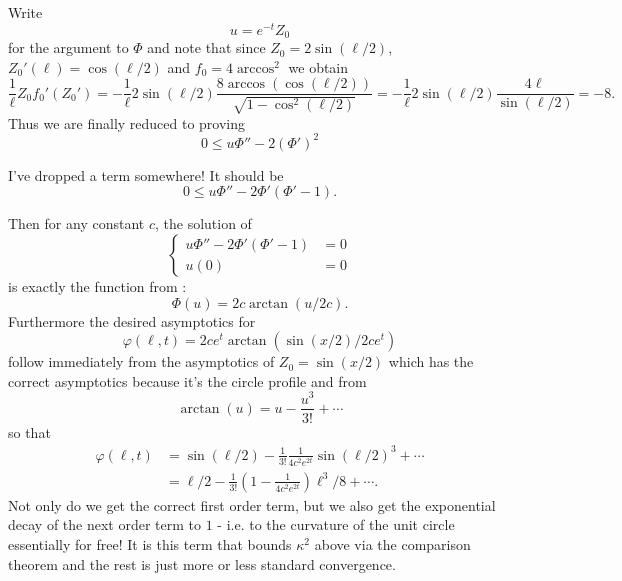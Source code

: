 \documentclass{amsart}
\begin{document}
Write
\[
u = e^{-t} Z_0
\]
for the argument to \(\Phi\) and note that since \(Z_0 = 2 \sin(\ell/2)\), \(Z_0'(\ell) = \cos(\ell/2)\) and \(f_0 = 4 \arccos^2\) we obtain
\[
\frac{1}{\ell} Z_0 f_0'(Z_0') = - \frac{1}{\ell} 2 \sin(\ell/2) \frac{8\arccos(\cos(\ell/2))}{\sqrt{1 - \cos^2(\ell/2)}} = - \frac{1}{\ell} 2 \sin(\ell/2) \frac{4\ell}{\sin(\ell/2)} = -8.
\]
Thus we are finally reduced to proving
\[
0 \leq u \Phi'' - 2 (\Phi')^2
\]

I've dropped a term somewhere! It should be
\[
0 \leq u \Phi'' - 2 \Phi'(\Phi' - 1).
\]

Then for any constant \(c\), the solution of
\[
\begin{cases}
u \Phi'' - 2 \Phi'(\Phi' - 1) &= 0 \\
u(0) &= 0
\end{cases}
\]
is exactly the function from \cite{AndrewsBryan:01/2011}:
\[
\Phi(u) = 2 c \arctan(u/2c).
\]
Furthermore the desired asymptotics for
\[
\varphi(\ell, t) = 2c e^t \arctan(\sin(x/2)/2c e^t)
\]
follow immediately from the asymptotics of \(Z_0 = \sin(x/2)\) which has the correct asymptotics because it's the circle profile and from
\[
\arctan(u) = u - \frac{u^3}{3!} + \cdots
\]
so that
\[
\begin{split}
\varphi(\ell, t) &= \sin(\ell/2) - \frac{1}{3!} \frac{1}{4c^2 e^{2t}} \sin(\ell/2)^3 + \cdots \\
&= \ell/2 - \frac{1}{3!} \left(1 - \frac{1}{4c^2 e^{2t}}\right) \ell^3/8 + \cdots.
\end{split}
\]
Not only do we get the correct first order term, but we also get the exponential decay of the next order term to \(1\) - i.e. to the curvature of the unit circle essentially for free! It is this term that bounds \(\kappa^2\) above via the comparison theorem and the rest is just more or less standard convergence.
\end{document}
